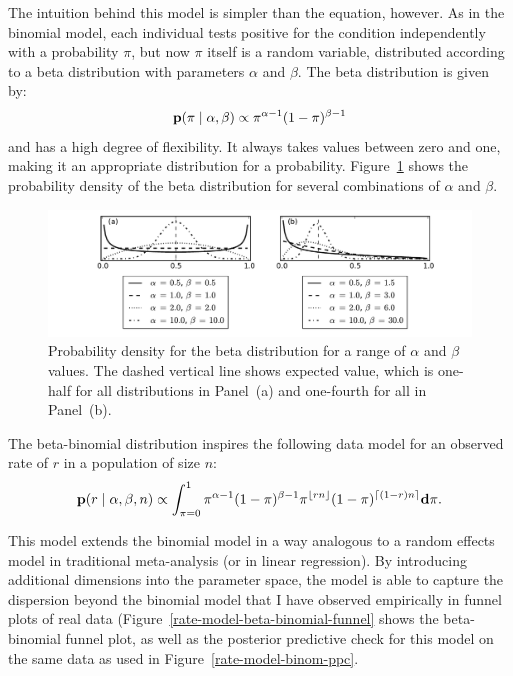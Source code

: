 The intuition behind this model is simpler than the equation,
however. As in the binomial model, each individual tests positive for
the condition independently with a probability $\pi$, but now $\pi$
itself is a random variable, distributed according to a beta
distribution with parameters $\alpha$ and $\beta$. The beta
distribution is given by:
\[
\mathbf{p}(\pi\;|\; \alpha, \beta)
\propto \pi^{\alpha-1}(1-\pi)^{\beta-1}
\]
and has a high degree of flexibility.  It always takes values
between zero and one, making it an appropriate distribution for a
probability.  Figure~\ref{rate-model-beta} shows the probability
density of the beta distribution for several combinations of $\alpha$
and $\beta$.
\begin{figure}[ht]
\begin{center}
\includegraphics[width=\textwidth]{beta-distribution.pdf}
\end{center}
\caption{Probability density for the beta distribution for a range of
  $\alpha$ and $\beta$ values. The dashed vertical line shows expected value,
  which is one-half for all distributions in Panel~(a) and
  one-fourth for all in Panel~(b).}
\label{rate-model-beta}
\end{figure}

The beta-binomial distribution inspires the following data model for
an observed rate of $r$ in a population of size $n$:
\[
\mathbf{p}(r\;|\; \alpha, \beta, n) \propto
\int_{\pi=0}^1 \pi^{\alpha-1}(1-\pi)^{\beta-1}
\pi^{\lfloor rn\rfloor} (1-\pi)^{\lceil (1-r)n\rceil} \mathbf{d}\pi.
\]

This model extends the binomial model in a way analogous to a random
effects model in traditional meta-analysis\cite{borenstein_introduction_2011} (or in linear regression\cite{Rabe-Hesketh_Multilevel_2008}).  By introducing additional
dimensions into the parameter space, the model is able to capture the
dispersion beyond the binomial model that I have observed empirically
in funnel plots of real data
(Figure~\ref{rate-model-beta-binomial-funnel} shows the beta-binomial funnel plot, as well as the posterior predictive check for
this model on the same data as used in
Figure~\ref{rate-model-binom-ppc}.

